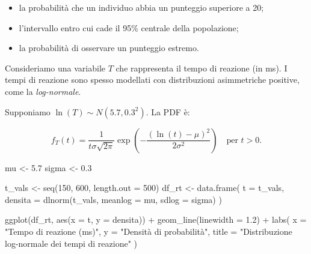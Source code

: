 \documentclass[
  italian,
  letterpaper,
  a4paper,
  11pt,
  open=any]{scrbook}
\newenvironment{Shaded}{\begin{snugshade}}{\end{snugshade}}
\newcommand{\AttributeTok}[1]{\textcolor[rgb]{0.40,0.45,0.13}{#1}}
\newcommand{\DecValTok}[1]{\textcolor[rgb]{0.68,0.00,0.00}{#1}}
\newcommand{\FloatTok}[1]{\textcolor[rgb]{0.68,0.00,0.00}{#1}}
\newcommand{\FunctionTok}[1]{\textcolor[rgb]{0.28,0.35,0.67}{#1}}
\newcommand{\NormalTok}[1]{\textcolor[rgb]{0.00,0.23,0.31}{#1}}
\newcommand{\OtherTok}[1]{\textcolor[rgb]{0.00,0.23,0.31}{#1}}
\newcommand{\SpecialCharTok}[1]{\textcolor[rgb]{0.37,0.37,0.37}{#1}}
\newcommand{\StringTok}[1]{\textcolor[rgb]{0.13,0.47,0.30}{#1}}
\providecommand{\tightlist}{%
  \setlength{\itemsep}{0pt}\setlength{\parskip}{0pt}}
\theoremstyle{plain}
\theoremstyle{definition}
\theoremstyle{definition}
\theoremstyle{remark}
\begin{document}
\begin{itemize}
\tightlist
\item
  la probabilità che un individuo abbia un punteggio superiore a 20;
\item
  l'intervallo entro cui cade il 95\% centrale della popolazione;
\item
  la probabilità di osservare un punteggio estremo.
\end{itemize}

\begin{tcolorbox}[enhanced jigsaw, arc=.35mm, bottomrule=.15mm, bottomtitle=1mm, breakable, colback=white, colbacktitle=quarto-callout-note-color!10!white, colframe=quarto-callout-note-color-frame, coltitle=black, left=2mm, leftrule=.75mm, opacityback=0, opacitybacktitle=0.6, rightrule=.15mm, title=\textcolor{quarto-callout-note-color}{\faInfo}\hspace{0.5em}{Esempio: tempo di reazione in un compito cognitivo}, titlerule=0mm, toprule=.15mm, toptitle=1mm]

Consideriamo una variabile \(T\) che rappresenta il tempo di reazione
(in ms). I tempi di reazione sono spesso modellati con distribuzioni
asimmetriche positive, come la \emph{log-normale}.

Supponiamo \(\ln(T) \sim N(5.7, 0.3^2)\). La PDF è:

\[
f_T(t) = \frac{1}{t \sigma \sqrt{2\pi}} \exp\left(-\frac{(\ln(t) - \mu)^2}{2\sigma^2}\right) \quad \text{per } t > 0.
\]

\begin{Shaded}
\begin{Highlighting}[]
\NormalTok{mu }\OtherTok{\textless{}{-}} \FloatTok{5.7}
\NormalTok{sigma }\OtherTok{\textless{}{-}} \FloatTok{0.3}

\NormalTok{t\_vals }\OtherTok{\textless{}{-}} \FunctionTok{seq}\NormalTok{(}\DecValTok{150}\NormalTok{, }\DecValTok{600}\NormalTok{, }\AttributeTok{length.out =} \DecValTok{500}\NormalTok{)}
\NormalTok{df\_rt }\OtherTok{\textless{}{-}} \FunctionTok{data.frame}\NormalTok{(}
  \AttributeTok{t =}\NormalTok{ t\_vals,}
  \AttributeTok{densita =} \FunctionTok{dlnorm}\NormalTok{(t\_vals, }\AttributeTok{meanlog =}\NormalTok{ mu, }\AttributeTok{sdlog =}\NormalTok{ sigma)}
\NormalTok{)}

\FunctionTok{ggplot}\NormalTok{(df\_rt, }\FunctionTok{aes}\NormalTok{(}\AttributeTok{x =}\NormalTok{ t, }\AttributeTok{y =}\NormalTok{ densita)) }\SpecialCharTok{+}
  \FunctionTok{geom\_line}\NormalTok{(}\AttributeTok{linewidth =} \FloatTok{1.2}\NormalTok{) }\SpecialCharTok{+}
  \FunctionTok{labs}\NormalTok{(}
    \AttributeTok{x =} \StringTok{"Tempo di reazione (ms)"}\NormalTok{,}
    \AttributeTok{y =} \StringTok{"Densità di probabilità"}\NormalTok{,}
    \AttributeTok{title =} \StringTok{"Distribuzione log{-}normale dei tempi di reazione"}
\NormalTok{  )}
\end{Highlighting}
\end{Shaded}


\end{tcolorbox}
\end{document}
